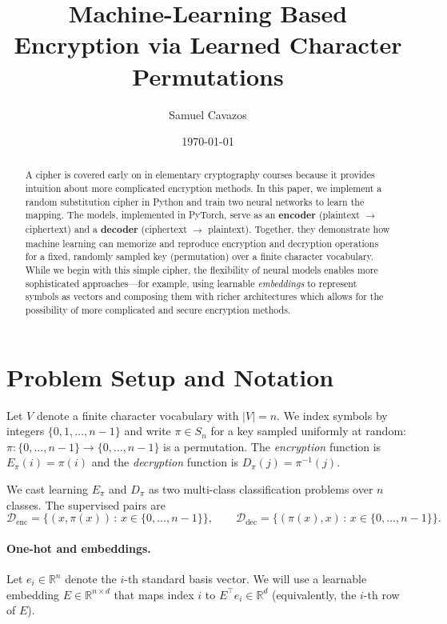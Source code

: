 \documentclass[12pt]{article}
\title{Machine-Learning Based Encryption via Learned Character Permutations}
\author{Samuel Cavazos}
\date{\today}
\theoremstyle{plain}
\theoremstyle{remark}
\begin{document}
\maketitle

\begin{abstract}
A cipher is covered early on in elementary cryptography courses because it provides intuition about more complicated encryption methods. In this paper, we implement a random substitution cipher in Python and train two neural networks to learn the mapping. The models, implemented in PyTorch, serve as an \textbf{encoder} (plaintext $\rightarrow$ ciphertext) and a \textbf{decoder} (ciphertext $\rightarrow$ plaintext). Together, they demonstrate how machine learning can memorize and reproduce encryption and decryption operations for a fixed, randomly sampled key (permutation) over a finite character vocabulary. While we begin with this simple cipher, the flexibility of neural models enables more sophisticated approaches—for example, using learnable \emph{embeddings} to represent symbols as vectors and composing them with richer architectures which allows for the possibility of more complicated and secure encryption methods.
\end{abstract}

\section{Problem Setup and Notation}
Let $V$ denote a finite character vocabulary with $|V|=n$. We index symbols by integers $\{0,1,\dots,n-1\}$ and write $\pi\in S_n$ for a key sampled uniformly at random: $\pi:\{0,\dots,n-1\}\!\to\!\{0,\dots,n-1\}$ is a permutation. The \emph{encryption} function is $E_\pi(i)=\pi(i)$ and the \emph{decryption} function is $D_\pi(j)=\pi^{-1}(j)$.

We cast learning $E_\pi$ and $D_\pi$ as two multi-class classification problems over $n$ classes. The supervised pairs are
\[
\mathcal{D}_{\mathrm{enc}}=\{(x,\pi(x))\,:\,x\in\{0,\dots,n-1\}\},\qquad
\mathcal{D}_{\mathrm{dec}}=\{(\pi(x),x)\,:\,x\in\{0,\dots,n-1\}\}.
\]

\paragraph{One-hot and embeddings.}
Let $e_i\in\mathbb{R}^n$ denote the $i$-th standard basis vector. We will use a learnable embedding $E\in\mathbb{R}^{n\times d}$ that maps index $i$ to $E^\top e_i\in\mathbb{R}^d$ (equivalently, the $i$-th row of $E$).
\end{document}
